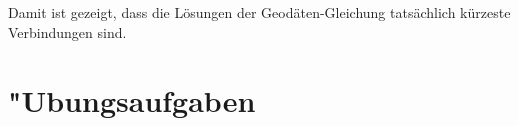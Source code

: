 Damit ist gezeigt, dass die Lösungen der Geodäten-Gleichung tatsächlich
kürzeste Verbindungen sind.



\section{"Ubungsaufgaben}

